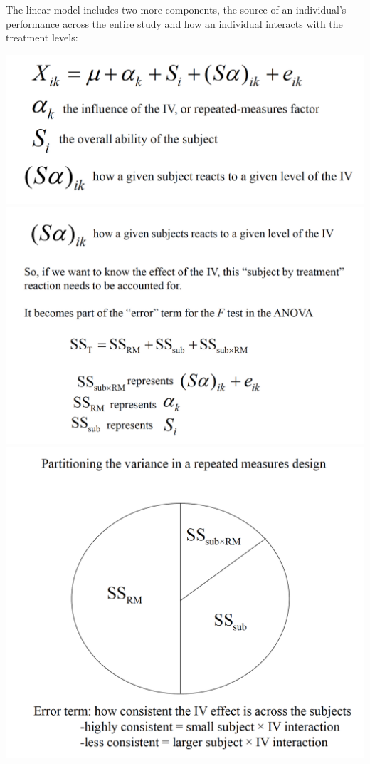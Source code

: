 \documentclass[]{book}
\theoremstyle{definition}
\theoremstyle{definition}
\theoremstyle{definition}
\theoremstyle{remark}
\begin{document}
The linear model includes two more components, the source of an
individual's performance across the entire study and how an individual
interacts with the treatment levels:

\includegraphics{img/hicksrma1.png} \includegraphics{img/hicksrma2.png}
\includegraphics{img/hicksrma3.png}
\end{document}
